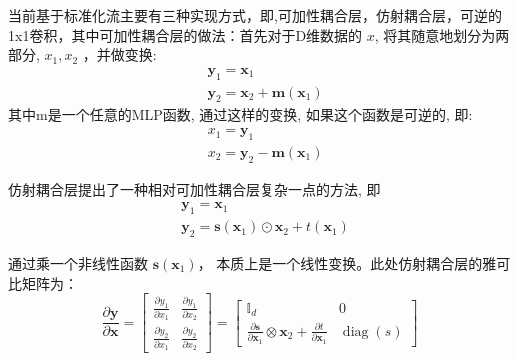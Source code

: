 当前基于标准化流主要有三种实现方式，即,可加性耦合层\cite{nice}，仿射耦合层\cite{realnvp}，可逆的1x1卷积\cite{glow}，其中可加性耦合层的做法：首先对于D维数据的 $x$, 将其随意地划分为两部分, $x_1, x_2$ ，并做变换:
\begin{equation}
    \begin{aligned}
        &\mathbf{y}_1=\boldsymbol{x}_1 \\
        &\mathbf{y}_2=\boldsymbol{x}_2+\boldsymbol{m}\left(\boldsymbol{x}_1\right)
        \end{aligned}
\end{equation}
其中m是一个任意的MLP函数, 通过这样的变换, 如果这个函数是可逆的, 即:
\begin{equation}
    \begin{aligned}
        &x_1=\mathbf{y}_1 \\
        &x_2=\mathbf{y}_2-\boldsymbol{m}\left(\boldsymbol{x}_1\right)
        \end{aligned}
\end{equation}

仿射耦合层提出了一种相对可加性耦合层复杂一点的方法, 即
\begin{equation}
    \begin{aligned}
        &\mathbf{y}_1=\boldsymbol{x}_1 \\
        &\mathbf{y}_2=\mathbf{s}\left(\mathbf{x}_1\right) \odot \boldsymbol{x}_2+t\left(\boldsymbol{x}_1\right)
        \end{aligned}
\end{equation}

通过乘一个非线性函数 $\mathbf{s}\left(\mathbf{x}_1\right)$， 本质上是一个线性变换。此处仿射耦合层的雅可比矩阵为：
\begin{equation}
    \frac{\partial \mathbf{y}}{\partial \mathbf{x}}=\left[\begin{array}{ll}
        \frac{\partial y_1}{\partial x_1} & \frac{\partial y_1}{\partial x_2} \\
        \frac{\partial y_2}{\partial x_1} & \frac{\partial y_2}{\partial x_2}
        \end{array}\right]=\left[\begin{array}{cc}
        \mathbb{I}_d & 0 \\
        \frac{\partial \mathbf{s}}{\partial \mathbf{x}_1} \otimes \mathbf{x}_2+\frac{\partial t}{\partial \mathbf{x}_1} & \operatorname{diag}(s)
        \end{array}\right]
\end{equation}


